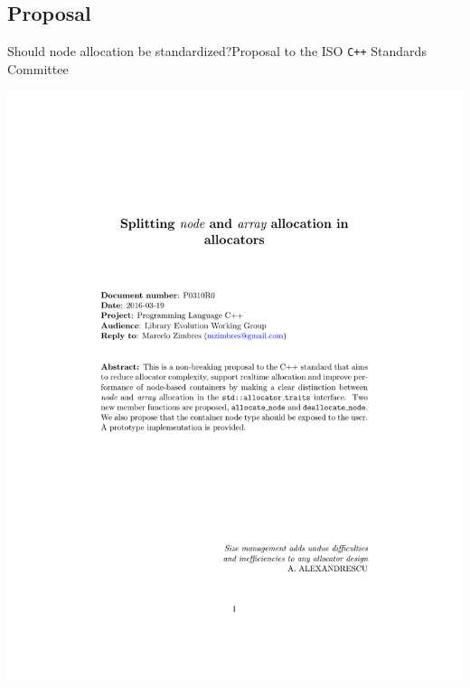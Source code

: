 \documentclass[10pt,aspectratio=169]{beamer}
\begin{document}
\subsection{Proposal}

\begin{frame}{Should node allocation be standardized?}{Proposal to the ISO \texttt{C++} Standards Committee}
\vspace{-3cm}
    \begin{center}
        \includegraphics[scale=0.6]{fig/prop1.pdf} \\
    \end{center}
\end{frame}
\end{document}
